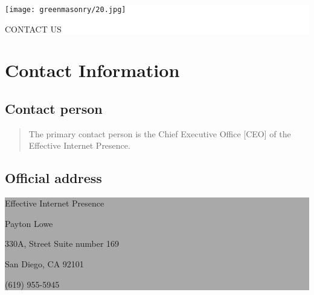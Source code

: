 \documentclass[35pt]{report}
\begin{document}
\thispagestyle{empty}

\vspace*{2cm}
\colorbox{white}{
	\parbox[t]{1.0\linewidth}{
       	\begin{center} 
			\fontsize{40pt}{11pt}\selectfont 
			\vspace*{.5cm}
				{\texttt{[image: greenmasonry/20.jpg]}}
				{CONTACT US\par}
			\vspace*{.5cm}
		\end{center}
	}
}

\clearpage

\normalsize

	\chapter{Contact Information}
		
		\section{Contact person}
		\begin{quote}
			The primary contact person is the Chief Executive Office [CEO] of the Effective Internet Presence.
		\end{quote}

		\section{Official address}
		
		\colorbox{darkgray}{
		\parbox[t]{1.0\linewidth}{
       	\begin{center} 
			\fontsize{13pt}{11pt}\selectfont 
			\vspace*{.1cm}
				{\color{white}Effective Internet Presence\par}
				{\color{white}Payton Lowe\par}
				{\color{white}330A, Street Suite number 169\par} 
				{\color{white}San Diego, CA 92101 \par}
				{\color{white}(619) 955-5945}		
			\vspace*{.1cm}
		\end{center}
		}
		}
\clearpage
\end{document}
